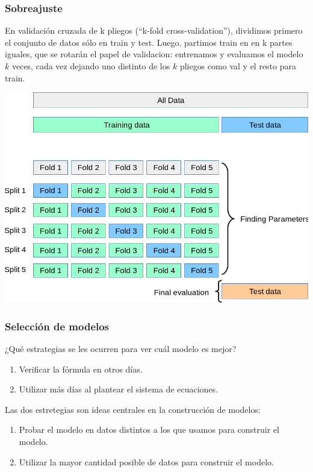 \documentclass[aspectratio=169,12pt]{beamer}
\begin{document}
\begin{frame}
\frametitle{Sobreajuste}

En validación cruzada de k pliegos (``k-fold cross-validation''), dividimos primero el conjunto de datos sólo en
train y test. Luego, partimos train en en k partes iguales, que se rotarán el papel de validacion: entrenamos y
evaluamos el modelo $k$ veces, cada vez dejando uno distinto de los $k$ pliegos como val y el resto para train.

\begin{center}
\includegraphics[scale=0.5]{clase10-grid_search_cross_validation.png}
\end{center}


\end{frame}



\begin{frame}
\frametitle{Selección de modelos}

¿Qué estrategias se les ocurren para ver cuál modelo es mejor? \pause

\begin{enumerate}
\item Verificar la fórmula en otros días. \pause
\item Utilizar más días al plantear el sistema de ecuaciones.
\end{enumerate}

\pause

Las dos estretegias son ideas centrales en la construcción de modelos:
\begin{enumerate}
\item Probar el modelo en datos distintos a los que usamos para construir el modelo.
\item Utilizar la mayor cantidad posible de datos para construir el modelo.
\end{enumerate}

\end{frame}
\end{document}
